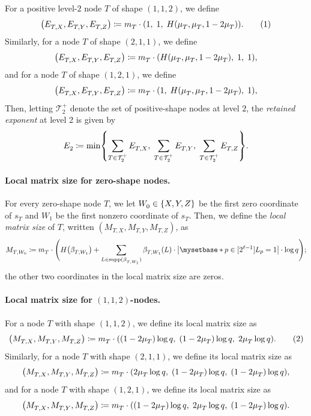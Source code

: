 \documentclass[11pt, a4paper, copyright, gdm]{google}
\theoremstyle{definition}
\theoremstyle{remark}
\theoremstyle{plain}
\newcommand{\defn}[1]{{\emph{{#1}}}}
\newcommand{\defeq}{\coloneqq}
\DeclareMathOperator{\supp}{supp}
\DeclarePairedDelimiter{\bk}{(}{)}
\DeclarePairedDelimiter{\BK}{\{}{\}}
\newcommand{\numberthis}{\addtocounter{equation}{1}\tag{\theequation}}
\begin{document}
For a positive level-$2$ node $T$ of shape $(1,1,2)$, we define
\[
  \bk*{E_{T,X}^{}, E_{T,Y}^{}, E_{T,Z}^{}}
  \defeq
  m_T^{} \cdot
  \bk*{1,\; 1,\; H\bk*{\mu_T^{}, \mu_T^{}, 1 - 2\mu_T^{}}}.
  \numberthis \label{eq:E-112}
\]
Similarly, for a node $T$ of shape $(2,1,1)$, we define
\[
  \bk*{E_{T,X}^{}, E_{T,Y}^{}, E_{T,Z}^{}}
  \defeq
  m_T^{} \cdot
  \bk*{H\bk*{\mu_T^{}, \mu_T^{}, 1 - 2\mu_T^{}},\; 1,\; 1},
\]
and for a node $T$ of shape $(1,2,1)$, we define
\[
  \bk*{E_{T,X}^{}, E_{T,Y}^{}, E_{T,Z}^{}}
  \defeq
  m_T^{} \cdot
  \bk*{1,\; H\bk*{\mu_T^{}, \mu_T^{}, 1 - 2\mu_T^{}},\;  1},
\]
Then, letting $\mathcal T_2^+$ denote the set of positive-shape nodes at level $2$, the \emph{retained exponent} at level 2 is given by
\[
  E_2^{}
  \defeq
  \min\BK*{
    \sum_{T \in \mathcal T_2^+} E_{T,X}^{}, \;
    \sum_{T \in \mathcal T_2^+} E_{T,Y}^{}, \;
    \sum_{T \in \mathcal T_2^+} E_{T,Z}^{}
  }.
\]

\paragraph{Local matrix size for zero-shape nodes.}

For every zero-shape node $T$, we let $W_0^{} \in \BK{X,Y,Z}$ be the first zero coordinate of $s_T^{}$ and $W_1^{}$ be the first nonzero coordinate of $s_T^{}$.
Then, we define the \defn{local matrix size} of $T$, written $(M_{T,X}^{}, M_{T,Y}^{}, M_{T,Z}^{})$, as
\[
  M_{T, W_0}^{} \defeq
  m_T^{} \cdot \bk[\Bigg]{
  H\bk*{\beta_{T,W_1}^{}}
  + \sum_{L \in \supp(\beta_{T,W_1}^{})}
  \beta_{T,W_1}^{}(L) \cdot
  \left| \myset* {p \in [2^{\ell - 1}]}{L_p = 1} \right|
  \cdot \log q};
\]
the other two coordinates in the local matrix size are zeros.


\paragraph{Local matrix size for $(1,1,2)$-nodes.}
For a node $T$ with shape $(1,1,2)$, we define its local matrix size as
\[
  \bk*{M_{T,X}^{}, M_{T,Y}^{}, M_{T,Z}^{}}
  \defeq
  m_T^{} \cdot \bk*{
    (1 - 2\mu_T^{})\log q, \;
    (1 - 2\mu_T^{})\log q, \;
    2\mu_T^{}\log q
  }.
  \numberthis \label{eq:msize-112}
\]
Similarly, for a node $T$ with shape $(2,1,1)$, we define its local matrix size as
\[
  \bk*{M_{T,X}^{}, M_{T,Y}^{}, M_{T,Z}^{}}
  \defeq
  m_T^{} \cdot \bk*{
    2\mu_T^{}\log q, \;
    (1 - 2\mu_T^{})\log q, \;
    (1 - 2\mu_T^{})\log q
  },
\]
and for a node $T$ with shape $(1,2,1)$, we define its local matrix size as
\[
  \bk*{M_{T,X}^{}, M_{T,Y}^{}, M_{T,Z}^{}}
  \defeq
  m_T^{} \cdot \bk*{
    (1 - 2\mu_T^{})\log q, \;
    2\mu_T^{}\log q, \;
    (1 - 2\mu_T^{})\log q
  }.
\]
\end{document}
